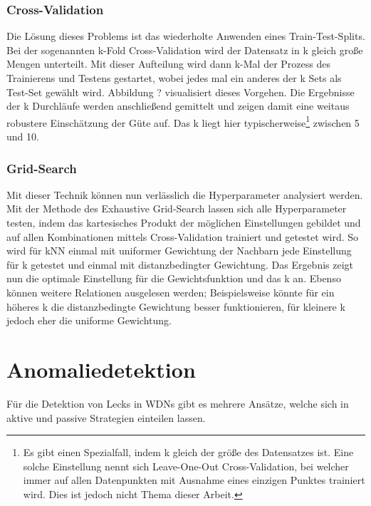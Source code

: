 \subsection*{Cross-Validation}

Die Lösung dieses Problems ist das wiederholte Anwenden eines Train-Test-Splits. Bei der sogenannten
 k-Fold Cross-Validation wird der Datensatz in k gleich große Mengen unterteilt. Mit dieser Aufteilung
 wird dann k-Mal der Prozess des Trainierens und Testens gestartet, wobei jedes mal ein anderes der k Sets als
 Test-Set gewählt wird. Abbildung ? visualisiert dieses Vorgehen. Die Ergebnisse der k Durchläufe werden
 anschließend gemittelt und zeigen damit eine weitaus robustere Einschätzung der Güte auf. Das k liegt hier
 typischerweise\footnote{Es gibt einen Spezialfall, indem k gleich der größe des Datensatzes ist. Eine solche
 Einstellung nennt sich Leave-One-Out Cross-Validation, bei welcher immer auf allen Datenpunkten mit Ausnahme
 eines einzigen Punktes trainiert wird. Dies ist jedoch nicht Thema dieser Arbeit.} zwischen 5 und 10.

\subsection*{Grid-Search}

Mit dieser Technik können nun verlässlich die Hyperparameter analysiert werden. Mit der Methode des Exhaustive
 Grid-Search lassen sich alle Hyperparameter testen, indem das kartesisches Produkt der möglichen Einstellungen
 gebildet und auf allen Kombinationen mittels Cross-Validation trainiert und getestet wird. So wird für kNN einmal
 mit uniformer Gewichtung der Nachbarn jede Einstellung für k getestet und einmal mit distanzbedingter Gewichtung.
 Das Ergebnis zeigt nun die optimale Einstellung für die Gewichtsfunktion und das k an. Ebenso können weitere
 Relationen ausgelesen werden; Beispielsweise könnte für ein höheres k die distanzbedingte Gewichtung besser
 funktionieren, für kleinere k jedoch eher die uniforme Gewichtung.


\chapter{Anomaliedetektion}

Für die Detektion von Lecks in WDNs gibt es mehrere Ansätze, welche sich in aktive und passive
 Strategien einteilen lassen.

